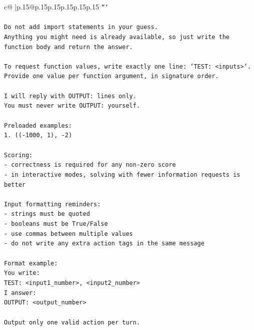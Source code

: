 \documentclass{article}
\begin{document}
{\begin{supertabular}{c@{$\;$}|p{.15\linewidth}@{}p{.15\linewidth}p{.15\linewidth}p{.15\linewidth}p{.15\linewidth}p{.15\linewidth}}
{{{\texttt{```} \\
\\ 
\texttt{Do not add import statements in your guess.} \\
\texttt{Anything you might need is already available, so just write the function body and return the answer.} \\
\\ 
\texttt{To request function values, write exactly one line: `TEST: <inputs>`.} \\
\texttt{Provide one value per function argument, in signature order.} \\
\\ 
\texttt{I will reply with OUTPUT: lines only.} \\
\texttt{You must never write OUTPUT: yourself.} \\
\\ 
\texttt{Preloaded examples:} \\
\texttt{1. (({-}1000, 1), {-}2)} \\
\\ 
\texttt{Scoring:} \\
\texttt{{-} correctness is required for any non{-}zero score} \\
\texttt{{-} in interactive modes, solving with fewer information requests is better} \\
\\ 
\texttt{Input formatting reminders:} \\
\texttt{{-} strings must be quoted} \\
\texttt{{-} booleans must be True/False} \\
\texttt{{-} use commas between multiple values} \\
\texttt{{-} do not write any extra action tags in the same message} \\
\\ 
\texttt{Format example:} \\
\texttt{You write:} \\
\texttt{TEST: <input1\_number>, <input2\_number>} \\
\texttt{I answer:} \\
\texttt{OUTPUT: <output\_number>} \\
\\ 
\texttt{Output only one valid action per turn.} \\
            }
        }
    }
     \\ \\


\end{supertabular}}
\end{document}
